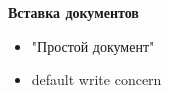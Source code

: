\documentclass[usenames,dvipsnames, 18pt, compress, aspectratio=169]{beamer}
\begin{document}





\begin{frame}
    \frametitle{}
    \begin{center}
        \textbf{Вставка документов}
        \begin{itemize}[label={}]
            \item "Простой документ"
            \item default write concern
        \end{itemize}
    \end{center}
\end{frame}
\end{document}
